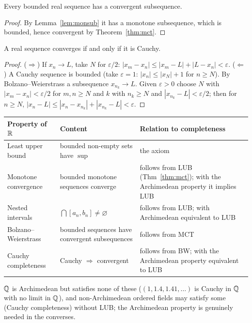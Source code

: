 \begin{theorem}\label{thm:bw}
	Every bounded real sequence has a convergent subsequence.
\end{theorem}
\begin{proof}
	By Lemma~\ref{lem:monsub} it has a monotone subsequence, which is bounded, hence convergent by Theorem~\ref{thm:mct}.
\end{proof}

\begin{theorem}\label{thm:cauchy}
	A real sequence converges if and only if it is Cauchy.
\end{theorem}
\begin{proof}
	($\Rightarrow$) If $x_n\to L$, take $N$ for $\varepsilon/2$: $|x_m-x_n|\le|x_m-L|+|L-x_n|<\varepsilon$. ($\Leftarrow$) A Cauchy sequence is bounded (take $\varepsilon=1$: $|x_n|\le|x_N|+1$ for $n\ge N$). By Bolzano--Weierstrass a subsequence $x_{n_k}\to L$. Given $\varepsilon>0$ choose $N$ with $|x_m-x_n|<\varepsilon/2$ for $m,n\ge N$ and $k$ with $n_k\ge N$ and $|x_{n_k}-L|<\varepsilon/2$; then for $n\ge N$, $|x_n-L|\le|x_n-x_{n_k}|+|x_{n_k}-L|<\varepsilon$.
\end{proof}

\begin{center}
	\begin{tabular}{@{}p{3.5cm}p{4.6cm}p{6.5cm}@{}}
		\toprule
		\textbf{Property of $\mathbb{R}$} & \textbf{Content} & \textbf{Relation to completeness}\\
		\midrule
		Least upper bound & bounded non-empty sets have $\sup$ & the axiom\\
		Monotone convergence & bounded monotone sequences converge & follows from LUB (Thm~\ref{thm:mct}); with the Archimedean property it implies LUB\\
		Nested intervals & $\bigcap[a_n,b_n]\ne\varnothing$ & follows from LUB; with Archimedean equivalent to LUB\\
		Bolzano--Weierstrass & bounded sequences have convergent subsequences & follows from MCT\\
		Cauchy completeness & Cauchy $\Rightarrow$ convergent & follows from BW; with the Archimedean property equivalent to LUB\\
		\bottomrule
	\end{tabular}
\end{center}
$\mathbb{Q}$ is Archimedean but satisfies none of these ($(1,1.4,1.41,\dots)$ is Cauchy in $\mathbb{Q}$ with no limit in $\mathbb{Q}$), and non-Archimedean ordered fields may satisfy some (Cauchy completeness) without LUB; the Archimedean property is genuinely needed in the converses.